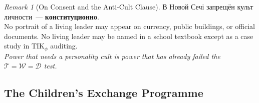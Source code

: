 \documentclass[11pt,a4paper]{article}
\theoremstyle{definition}
\theoremstyle{remark}
\newtheorem{remark}{Remark}
\newcommand{\TIKpharisee}{\text{TIK}_{\phi}}    %
\newcommand{\Thought}{\mathcal{T}}
\newcommand{\Word}{\mathcal{W}}
\newcommand{\Deed}{\mathcal{D}}
\newcommand{\IntegrityAxiom}{\Thought = \Word = \Deed}
\begin{document}
\begin{remark}[On Consent and the Anti-Cult Clause]
\foreignlanguage{russian}{
В Новой Сечі запрещён культ личности~---
\textbf{конституционно}.\\[0.1cm]
}
No portrait of a living leader may appear on currency,
public buildings, or official documents.
No living leader may be named in a school textbook
except as a case study in $\TIKpharisee$ auditing.\\[0.1cm]
\textit{Power that needs a personality cult
is power that has already failed the $\IntegrityAxiom$ test.}
\end{remark}

\subsection{The Children's Exchange Programme}
\label{sec:sich-children}
\end{document}
